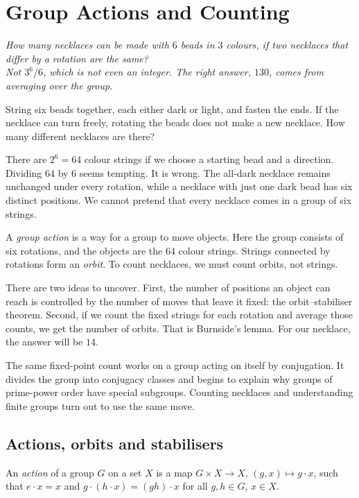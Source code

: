 \chapter{Group Actions and Counting}

\begin{center}\itshape
How many necklaces can be made with $6$ beads in $3$ colours, if two necklaces that differ by a rotation are the same?\\
Not $3^6/6$, which is not even an integer. The right answer, $130$, comes from averaging over the group.
\end{center}

String six beads together, each either dark or light, and fasten the ends. If the necklace can turn freely, rotating the beads does not make a new necklace. How many different necklaces are there?

There are $2^6=64$ colour strings if we choose a starting bead and a direction. Dividing $64$ by $6$ seems tempting. It is wrong. The all-dark necklace remains unchanged under every rotation, while a necklace with just one dark bead has six distinct positions. We cannot pretend that every necklace comes in a group of six strings.

A \emph{group action} is a way for a group to move objects. Here the group consists of six rotations, and the objects are the $64$ colour strings. Strings connected by rotations form an \emph{orbit}. To count necklaces, we must count orbits, not strings.

There are two ideas to uncover. First, the number of positions an object can reach is controlled by the number of moves that leave it fixed: the orbit--stabiliser theorem. Second, if we count the fixed strings for each rotation and average those counts, we get the number of orbits. That is Burnside's lemma. For our necklace, the answer will be $14$.

The same fixed-point count works on a group acting on itself by conjugation. It divides the group into conjugacy classes and begins to explain why groups of prime-power order have special subgroups. Counting necklaces and understanding finite groups turn out to use the same move.

\section{Actions, orbits and stabilisers}

\begin{definition}
An \emph{action} of a group $G$ on a set $X$ is a map $G\times X\to X$, $(g,x)\mapsto g\cdot x$, such that $e\cdot x=x$ and $g\cdot(h\cdot x)=(gh)\cdot x$ for all $g,h\in G$, $x\in X$.
\end{definition}

